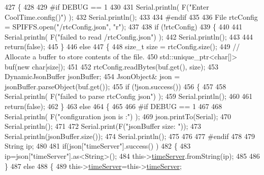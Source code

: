 \begin{DoxyCode}
427 \{
428 
429 \textcolor{preprocessor}{#if DEBUG == 1 }
430 
431     Serial.println( F(\textcolor{stringliteral}{"Enter CoolTime.config()"}) );
432     Serial.println();
433 
434 \textcolor{preprocessor}{#endif }
435 
436     File rtcConfig = SPIFFS.open(\textcolor{stringliteral}{"/rtcConfig.json"}, \textcolor{stringliteral}{"r"});
437 
438     \textcolor{keywordflow}{if} (!rtcConfig) 
439     \{
440     
441         Serial.println( F(\textcolor{stringliteral}{"failed to read /rtcConfig.json"}) );
442         Serial.println();
443 
444         \textcolor{keywordflow}{return}(\textcolor{keyword}{false});
445     \}
446     \textcolor{keywordflow}{else}
447     \{
448         \textcolor{keywordtype}{size\_t} size = rtcConfig.size();
449         \textcolor{comment}{// Allocate a buffer to store contents of the file.}
450         std::unique\_ptr<char[]> buf(\textcolor{keyword}{new} \textcolor{keywordtype}{char}[size]);
451 
452         rtcConfig.readBytes(buf.get(), size);
453         DynamicJsonBuffer jsonBuffer;
454         JsonObject& json = jsonBuffer.parseObject(buf.get());
455         \textcolor{keywordflow}{if} (!json.success()) 
456         \{
457 
458             Serial.println( F(\textcolor{stringliteral}{"failed to parse rtcConfig json"}) );
459             Serial.println();
460 
461             \textcolor{keywordflow}{return}(\textcolor{keyword}{false});
462         \} 
463         \textcolor{keywordflow}{else}
464         \{  
465         
466 \textcolor{preprocessor}{        #if DEBUG == 1 }
467 
468             Serial.println( F(\textcolor{stringliteral}{"configuration json is :"}) );
469             json.printTo(Serial);
470             Serial.println();
471 
472             Serial.print(F(\textcolor{stringliteral}{"jsonBuffer size: "}));
473             Serial.println(jsonBuffer.size());
474             Serial.println();
475 
476 
477 \textcolor{preprocessor}{        #endif}
478 
479             String ip;
480             
481             \textcolor{keywordflow}{if}(json[\textcolor{stringliteral}{"timeServer"}].success() )
482             \{           
483                  ip=json[\textcolor{stringliteral}{"timeServer"}].as<String>();
484                 this->\hyperlink{class_cool_time_ad2b9858f399108cb440dd1e908916f04}{timeServer}.fromString(ip);
485                 
486             \}
487             \textcolor{keywordflow}{else}
488             \{
489                 this->\hyperlink{class_cool_time_ad2b9858f399108cb440dd1e908916f04}{timeServer}=this->\hyperlink{class_cool_time_ad2b9858f399108cb440dd1e908916f04}{timeServer};

\end{DoxyCode}
